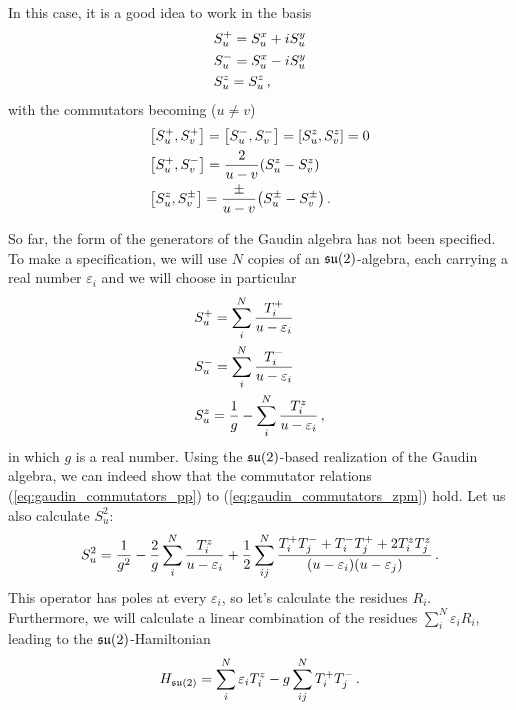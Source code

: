        In this case, it is a good idea to work in the basis
        \begin{align}
            & S^+_u = S^x_u + i S^y_u \\
            & S^-_u = S^x_u - i S^y_u \\
            & S^z_u = S^z_u \thinspace ,
        \end{align}
        with the commutators becoming ($u \neq v$)
        \begin{align}
            & \comm{S^+_u}{S^+_v} = \comm{S^-_u}{S^-_v} = \comm{S^z_u}{S^z_v} = 0 \label{eq:gaudin_commutators_pp} \\
            & \comm{S^+_u}{S^-_v} = \frac{2}{u-v} \qty(S^z_u - S^z_v) \label{eq:gaudin_commutators_pm} \\
            & \comm{S^z_u}{S^\pm_v} = \frac{\pm}{u - v} \qty(S^\pm_u - S^\pm_v) \label{eq:gaudin_commutators_zpm} \thinspace .
        \end{align}

        So far, the form of the generators of the Gaudin algebra has not been specified. To make a specification, we will use $N$ copies of an $\operatorname{\mathfrak{su}}(2)$-algebra, each carrying a real number $\varepsilon_i$ and we will choose in particular
        \begin{align}
            & S^+_u = \sum_i^N \frac{T^+_i}{u - \varepsilon_i} \\
            & S^-_u = \sum_i^N \frac{T^-_i}{u - \varepsilon_i} \\
            & S^z_u = \frac{1}{g} - \sum_i^N \frac{T^z_i}{u - \varepsilon_i} \thinspace ,
        \end{align}
        in which $g$ is a real number. Using the $\operatorname{\mathfrak{su}}(2)$-based realization of the Gaudin algebra, we can indeed show that the commutator relations (\ref{eq:gaudin_commutators_pp}) to (\ref{eq:gaudin_commutators_zpm}) hold. Let us also calculate $S^2_u$:
        \begin{equation}
            S^2_u = \frac{1}{g^2} - \frac{2}{g} \sum_i^N \frac{T^z_i}{u - \varepsilon_i} + \frac{1}{2} \sum_{ij}^N \frac{T^+_i T^-_j + T^-_i T^+_j + 2 T^z_i T^z_j}{(u - \varepsilon_i)(u - \varepsilon_j)} \thinspace .
        \end{equation}
        This operator has poles at every $\varepsilon_i$, so let's calculate the residues $R_i$. Furthermore, we will calculate a linear combination of the residues $\sum_i^N \varepsilon_i R_i$, leading to the $\operatorname{\mathfrak{su}}(2)$-Hamiltonian \cite{johnsonphd}
        \begin{equation}
            H_{\operatorname{\mathfrak{su}}(2)} = \sum_i^N \varepsilon_i T^z_i - g \sum_{ij}^N T^+_i T^-_j \thinspace .
        \end{equation}
